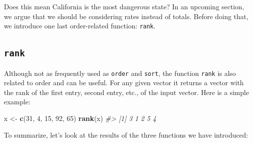 \documentclass[
]{krantz}
\newenvironment{Shaded}{\begin{snugshade}}{\end{snugshade}}
\newcommand{\CommentTok}[1]{\textcolor[rgb]{0.37,0.37,0.37}{\textit{#1}}}
\newcommand{\ControlFlowTok}[1]{\textcolor[rgb]{0.27,0.27,0.27}{\textbf{#1}}}
\newcommand{\DataTypeTok}[1]{\textcolor[rgb]{0.27,0.27,0.27}{#1}}
\newcommand{\DecValTok}[1]{\textcolor[rgb]{0.06,0.06,0.06}{#1}}
\newcommand{\KeywordTok}[1]{\textcolor[rgb]{0.27,0.27,0.27}{\textbf{#1}}}
\newcommand{\NormalTok}[1]{#1}
\newcommand{\OperatorTok}[1]{\textcolor[rgb]{0.43,0.43,0.43}{\textbf{#1}}}
\newcommand{\OtherTok}[1]{\textcolor[rgb]{0.37,0.37,0.37}{#1}}
\newcommand{\StringTok}[1]{\textcolor[rgb]{0.5,0.5,0.5}{#1}}
\begin{document}
Does this mean California is the most dangerous state? In an upcoming section, we argue that we should be considering rates instead of totals. Before doing that, we introduce one last order-related function: \texttt{rank}.

\hypertarget{rank}{%
\subsection{\texorpdfstring{\texttt{rank}}{rank}}\label{rank}}

Although not as frequently used as \texttt{order} and \texttt{sort}, the function \texttt{rank} is also related to order and can be useful.
For any given vector it returns a vector with the rank of the first entry, second entry, etc., of the input vector. Here is a simple example:

\begin{Shaded}
\begin{Highlighting}[]
\NormalTok{x <-}\StringTok{ }\KeywordTok{c}\NormalTok{(}\DecValTok{31}\NormalTok{, }\DecValTok{4}\NormalTok{, }\DecValTok{15}\NormalTok{, }\DecValTok{92}\NormalTok{, }\DecValTok{65}\NormalTok{)}
\KeywordTok{rank}\NormalTok{(x)}
\CommentTok{#> [1] 3 1 2 5 4}
\end{Highlighting}
\end{Shaded}

To summarize, let's look at the results of the three functions we have introduced:

\begin{Shaded}
\end{Shaded}
\end{document}
